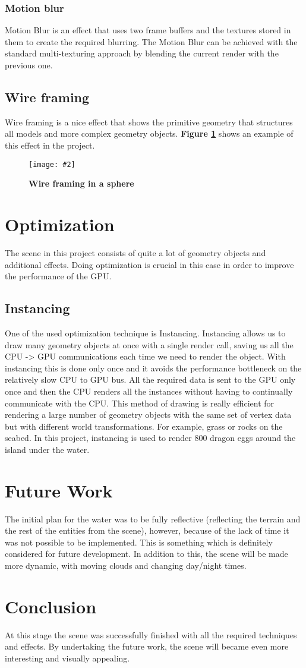 \documentclass[10pt, a4paper]{article}
\newcommand{\figuremacro}[5]{
    \begin{figure}[#1]
        \centering
        \texttt{[image: \#2]}
        \caption[#3]{\textbf{#3}#4}
        \label{fig:#2}
    \end{figure}
}
\begin{document}
	\subsubsection{Motion blur}
	Motion Blur is an effect that uses two frame buffers and the textures stored in them to create the required blurring. The Motion Blur can be achieved with the standard multi-texturing approach by blending the current render with the previous one.
	\subsection{Wire framing}
	Wire framing is a nice effect that shows the primitive geometry that structures all models and more complex geometry objects. \textbf{Figure {\ref{fig:wireFraming}}} shows an example of this effect in the project.
	\figuremacro{h}{wireFraming}{Wire framing in a sphere}{ }{1.0}
	\section{Optimization}
	The scene in this project consists of quite a lot of geometry objects and additional effects. Doing optimization is crucial in this case in order to improve the performance of the GPU.
	\subsection{Instancing}
	One of the used optimization technique is Instancing. Instancing  allows us to draw many geometry objects at once with a single render call, saving us all the CPU -> GPU communications each time we need to render the object. With instancing this is done only once and it avoids the performance bottleneck on the relatively slow CPU to GPU bus. All the required data is sent to the GPU only once and then the CPU renders all the instances without having to continually communicate with the CPU. This method of drawing is really efficient for rendering a large number of geometry objects with the same set of vertex data but with different world transformations. For example, grass or rocks on the seabed. In this project, instancing is used to render 800 dragon eggs around the island under the water.
	\section{Future Work}
	The initial plan for the water was to be fully reflective (reflecting the terrain and the rest of the entities from the scene), however, because of the lack of time it was not possible to be implemented. This is something which is definitely considered  for future development. In addition to this, the scene will be made more dynamic, with moving clouds and changing day/night times. 
	\section{Conclusion}
	At this stage the scene was successfully finished with all the required techniques and effects. By undertaking the future work, the scene will became even more interesting and visually appealing.	


		
\end{document}
